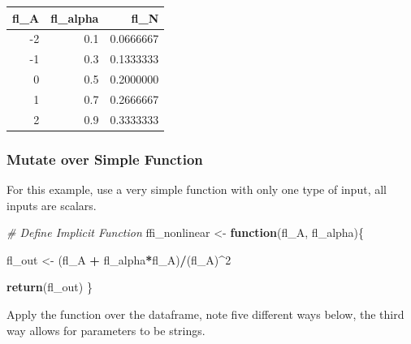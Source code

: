 \documentclass[
]{book}
\newenvironment{Shaded}{\begin{snugshade}}{\end{snugshade}}
\newcommand{\CommentTok}[1]{\textcolor[rgb]{0.56,0.35,0.01}{\textit{#1}}}
\newcommand{\ControlFlowTok}[1]{\textcolor[rgb]{0.13,0.29,0.53}{\textbf{#1}}}
\newcommand{\DecValTok}[1]{\textcolor[rgb]{0.00,0.00,0.81}{#1}}
\newcommand{\KeywordTok}[1]{\textcolor[rgb]{0.13,0.29,0.53}{\textbf{#1}}}
\newcommand{\NormalTok}[1]{#1}
\newcommand{\OperatorTok}[1]{\textcolor[rgb]{0.81,0.36,0.00}{\textbf{#1}}}
\newcommand{\StringTok}[1]{\textcolor[rgb]{0.31,0.60,0.02}{#1}}
\begin{document}
\begin{table}[!h]
\centering
\begin{tabular}{r|r|r}
\hline
fl\_A & fl\_alpha & fl\_N\\
\hline
\rowcolor{gray!6}  -2 & 0.1 & 0.0666667\\
\hline
-1 & 0.3 & 0.1333333\\
\hline
\rowcolor{gray!6}  0 & 0.5 & 0.2000000\\
\hline
1 & 0.7 & 0.2666667\\
\hline
\rowcolor{gray!6}  2 & 0.9 & 0.3333333\\
\hline
\end{tabular}
\end{table}

\hypertarget{mutate-over-simple-function}{%
\subsubsection{Mutate over Simple Function}\label{mutate-over-simple-function}}

For this example, use a very simple function with only one type of input, all inputs are scalars.

\begin{Shaded}
\begin{Highlighting}[]
\CommentTok{\# Define Implicit Function}
\NormalTok{ffi\_nonlinear \textless{}{-}}\StringTok{ }\ControlFlowTok{function}\NormalTok{(fl\_A, fl\_alpha)\{}

\NormalTok{  fl\_out \textless{}{-}}\StringTok{ }\NormalTok{(fl\_A }\OperatorTok{+}\StringTok{ }\NormalTok{fl\_alpha}\OperatorTok{*}\NormalTok{fl\_A)}\OperatorTok{/}\NormalTok{(fl\_A)}\OperatorTok{\^{}}\DecValTok{2}

  \KeywordTok{return}\NormalTok{(fl\_out)}
\NormalTok{\}}
\end{Highlighting}
\end{Shaded}

Apply the function over the dataframe, note five different ways below, the third way allows for parameters to be strings.
\end{document}
